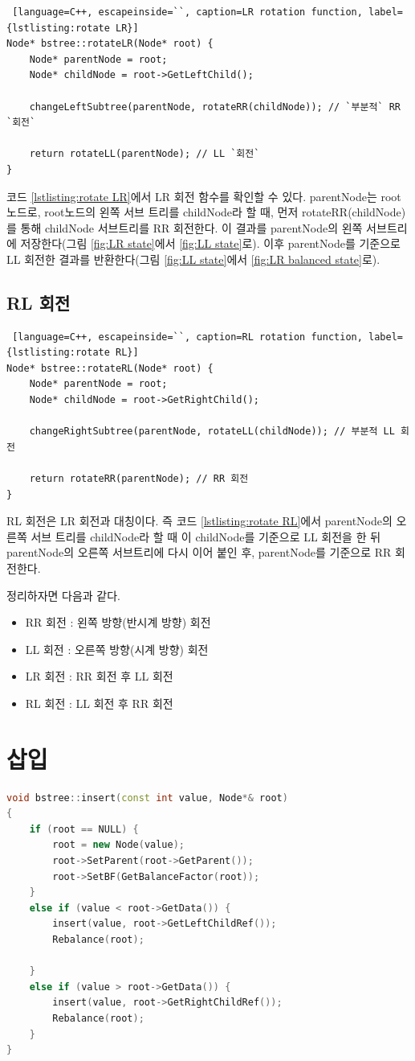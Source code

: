 \documentclass{article}
\begin{document}
\begin{lstlisting} [language=C++, escapeinside=``, caption=LR rotation function, label={lstlisting:rotate LR}]
Node* bstree::rotateLR(Node* root) {
	Node* parentNode = root;
	Node* childNode = root->GetLeftChild();

	changeLeftSubtree(parentNode, rotateRR(childNode)); // `부분적` RR `회전`

	return rotateLL(parentNode); // LL `회전`
}
\end{lstlisting}

코드 \ref{lstlisting:rotate LR}에서 LR 회전 함수를 확인할 수 있다. parentNode는 root 노드로, root노드의 왼쪽 서브 트리를 childNode라 할 때, 먼저 rotateRR(childNode)를 통해 childNode 서브트리를 RR 회전한다. 이 결과를 parentNode의 왼쪽 서브트리에 저장한다(그림 \ref{fig:LR state}에서 \ref{fig:LL state}로). 이후 parentNode를 기준으로 LL 회전한 결과를 반환한다(그림 \ref{fig:LL state}에서 \ref{fig:LR balanced state}로).

\subsection{RL 회전}
\begin{lstlisting} [language=C++, escapeinside=``, caption=RL rotation function, label={lstlisting:rotate RL}]
Node* bstree::rotateRL(Node* root) {
	Node* parentNode = root;
	Node* childNode = root->GetRightChild();

	changeRightSubtree(parentNode, rotateLL(childNode)); // 부분적 LL 회전

	return rotateRR(parentNode); // RR 회전
}
\end{lstlisting}
RL 회전은 LR 회전과 대칭이다. 즉 코드 \ref{lstlisting:rotate RL}에서 parentNode의 오른쪽 서브 트리를 childNode라 할 때 이 childNode를 기준으로 LL 회전을 한 뒤 parentNode의 오른쪽 서브트리에 다시 이어 붙인 후, parentNode를 기준으로 RR 회전한다.

정리하자면 다음과 같다.
\begin{itemize}
    \item RR 회전 : 왼쪽 방향(반시계 방향) 회전
    \item LL 회전 : 오른쪽 방향(시계 방향) 회전
    \item LR 회전 : RR 회전 후 LL 회전
    \item RL 회전 : LL 회전 후 RR 회전
\end{itemize}

\section{삽입}
\begin{lstlisting}[language=C++, escapeinside=``, caption=insert, label={lstlisting:insert}]
void bstree::insert(const int value, Node*& root)
{
	if (root == NULL) {
		root = new Node(value);
		root->SetParent(root->GetParent());
		root->SetBF(GetBalanceFactor(root));
	}
	else if (value < root->GetData()) {
		insert(value, root->GetLeftChildRef());
		Rebalance(root);

	}
	else if (value > root->GetData()) {
		insert(value, root->GetRightChildRef());
		Rebalance(root);
	}
}
\end{lstlisting}
\end{document}
